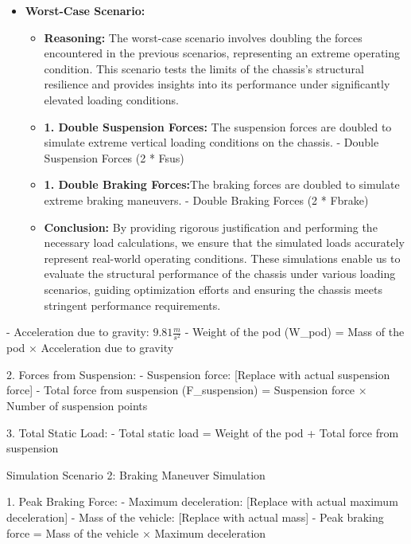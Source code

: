 \begin{itemize}  
  \item \textbf{Worst-Case Scenario:}
	\begin{itemize}
	  \item \textbf{Reasoning:} The worst-case scenario involves doubling the forces encountered in 				the previous scenarios, representing an extreme operating condition. This scenario tests the 				limits of the chassis's structural resilience and provides insights into its performance under 		significantly elevated loading 
		conditions.

	  \item \textbf{1.	Double Suspension Forces:} The suspension forces are doubled to simulate 					extreme vertical loading conditions on the chassis.
-	Double Suspension Forces (2 * Fsus)

	  \item \textbf{1.	Double Braking Forces:}The braking forces are doubled to simulate extreme 				braking maneuvers.
-	Double Braking Forces (2 * Fbrake)

	  \item \textbf{Conclusion:} By providing rigorous justification and performing the necessary load 		calculations, we ensure that the simulated loads accurately represent real-world operating 				conditions. These simulations enable us to evaluate the structural performance of the chassis 				under various loading scenarios, guiding optimization efforts and ensuring the chassis meets 				stringent performance requirements.

	\end{itemize}
\end{itemize}


-	Acceleration due to gravity: \(9.81\frac{m}{s^2}\)
-	Weight of the pod (W\_pod) = Mass of the pod × Acceleration due to gravity

2.	Forces from Suspension:
-	Suspension force: [Replace with actual suspension force]
-	Total force from suspension (F\_suspension) = Suspension force × Number of suspension points

3.	Total Static Load:
-	Total static load = Weight of the pod + Total force from suspension

Simulation Scenario 2: Braking Maneuver Simulation

1.	Peak Braking Force:
-	Maximum deceleration: [Replace with actual maximum deceleration]
-	Mass of the vehicle: [Replace with actual mass]
-	Peak braking force = Mass of the vehicle × Maximum deceleration

